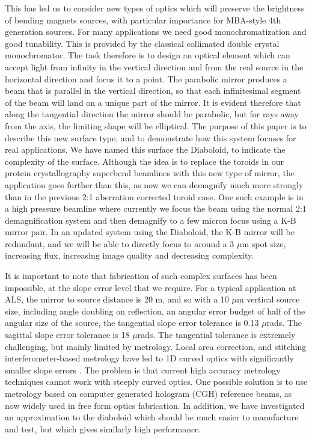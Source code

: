 \documentclass{iucr}              %
\begin{document}
This has led us to consider new types of optics which will preserve the brightness of bending magnets sources, with particular importance for MBA-style 4th generation sources.   
For many applications we need good monochromatization and good tunability.  This is provided by the classical collimated double crystal monochromator.  The task therefore is to design an optical element which can accept light from infinity in the vertical direction and from the real source in the horizontal direction and focus it to a point.  The parabolic mirror produces a beam that is parallel in the vertical direction, so that each infinitesimal segment of the beam will land on a unique part of the mirror.  It is evident therefore that along the tangential direction the mirror should be parabolic, but for rays away from the axis, the limiting shape will be elliptical. The purpose of this paper is to describe this new surface type, and to demonstrate how this system focuses for real applications. We have named this surface the Diaboloid, to indicate the complexity of the surface.   Although the idea is to replace the toroids in our protein crystallography superbend beamlines with this new type of mirror, the application goes further than this, as now we can demagnify much more strongly than in the previous 2:1 aberration corrected toroid case.  One such example is in a high pressure beamline where currently we focus the beam using the normal 2:1 demagnification system and then demagnify to a few micron focus using a K-B mirror pair.  In an updated system using the Diaboloid, the K-B mirror will be redundant, and we will be able to directly focus to around a 3 $\mu$m spot size, increasing flux, increasing image quality and decreasing complexity.

It is important to note that fabrication of such complex surfaces has been impossible, at the slope error level that we require.  For a typical application at ALS, the mirror to source distance is 20 m, and so with a 10 $\mu$m vertical source size, including angle doubling on reflection, an angular error budget of half of the angular size of the source, the tangential slope error tolerance is 0.13 $\mu$rads.  The sagittal slope error tolerance is 18 $\mu$rads.  The tangential tolerance is extremely challenging, but mainly limited by metrology.  Local area correction, and stitching interferometer-based metrology have led to 1D curved optics with significantly smaller slope errors \cite{Yamauchi2002}.  The problem is that current high accuracy metrology techniques cannot work with steeply curved optics.  One possible solution is to use metrology based on computer generated hologram (CGH) reference beams, as now widely used in free form optics fabrication. In addition, we have investigated an approximation to the diaboloid which should be much easier to manufacture and test, but which gives similarly high performance. 
\end{document}
